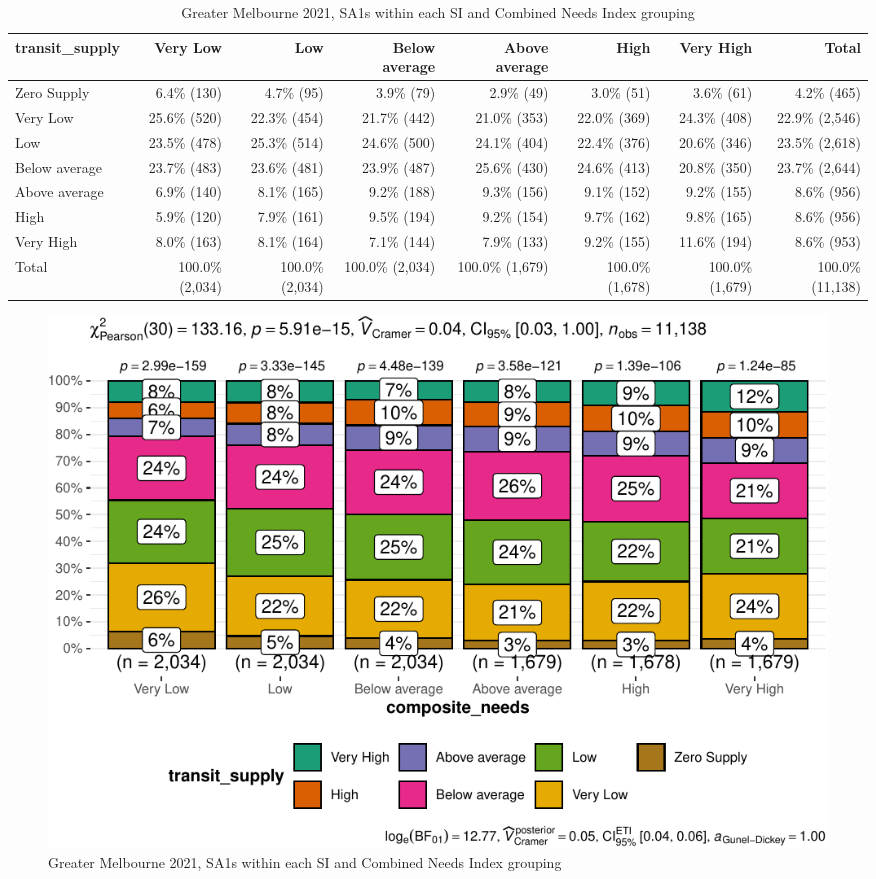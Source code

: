 \documentclass[preprint, 3p,
authoryear]{elsarticle} %
\begin{document}
\begin{table}

\caption{\label{tab:Greater_Melbourne_2021_needs_gap_zones}Greater Melbourne 2021, SA1s within each SI and Combined Needs Index grouping}
\centering
\fontsize{7}{9}\selectfont
\begin{tabular}[t]{l|r|r|r|r|r|r|r}
\hline
transit\_supply & Very Low & Low & Below average & Above average & High & Very High & Total\\
\hline
Zero Supply & 6.4\%   (130) & 4.7\%    (95) & 3.9\%    (79) & 2.9\%    (49) & 3.0\%    (51) & 3.6\%    (61) & 4.2\%    (465)\\
\hline
Very Low & 25.6\%   (520) & 22.3\%   (454) & 21.7\%   (442) & 21.0\%   (353) & 22.0\%   (369) & 24.3\%   (408) & 22.9\%  (2,546)\\
\hline
Low & 23.5\%   (478) & 25.3\%   (514) & 24.6\%   (500) & 24.1\%   (404) & 22.4\%   (376) & 20.6\%   (346) & 23.5\%  (2,618)\\
\hline
Below average & 23.7\%   (483) & 23.6\%   (481) & 23.9\%   (487) & 25.6\%   (430) & 24.6\%   (413) & 20.8\%   (350) & 23.7\%  (2,644)\\
\hline
Above average & 6.9\%   (140) & 8.1\%   (165) & 9.2\%   (188) & 9.3\%   (156) & 9.1\%   (152) & 9.2\%   (155) & 8.6\%    (956)\\
\hline
High & 5.9\%   (120) & 7.9\%   (161) & 9.5\%   (194) & 9.2\%   (154) & 9.7\%   (162) & 9.8\%   (165) & 8.6\%    (956)\\
\hline
Very High & 8.0\%   (163) & 8.1\%   (164) & 7.1\%   (144) & 7.9\%   (133) & 9.2\%   (155) & 11.6\%   (194) & 8.6\%    (953)\\
\hline
Total & 100.0\% (2,034) & 100.0\% (2,034) & 100.0\% (2,034) & 100.0\% (1,679) & 100.0\% (1,678) & 100.0\% (1,679) & 100.0\% (11,138)\\
\hline
\end{tabular}
\end{table}

\begin{figure}
\centering
\includegraphics{Leveraging_GTFS_to_assess_transit_supply_Transport_Geography_files/figure-latex/Greater_Melbourne_2021_needs_gap_zones-1.pdf}
\caption{Greater Melbourne 2021, SA1s within each SI and Combined Needs
Index grouping}
\end{figure}
\end{document}
